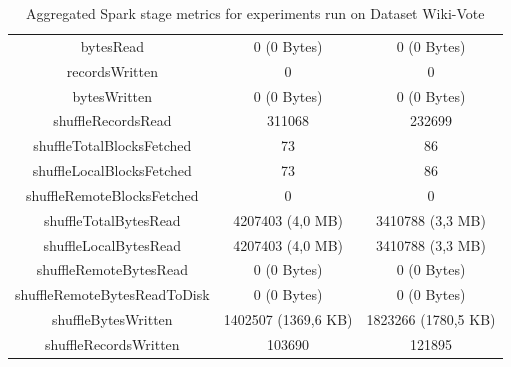 \documentclass[a4paper,11pt, twoside]{article}
\begin{document}
\begin{table}[h!]
\begin{tabular}{ccc}
                        bytesRead & 0 (0 Bytes) & 0 (0 Bytes) \\
                        recordsWritten & 0 & 0 \\
                        bytesWritten & 0 (0 Bytes) & 0 (0 Bytes) \\
                        shuffleRecordsRead & 311068 & 232699 \\
                        shuffleTotalBlocksFetched & 73 & 86 \\
                        shuffleLocalBlocksFetched & 73 & 86 \\
                        shuffleRemoteBlocksFetched & 0 & 0 \\
                        shuffleTotalBytesRead & 4207403 (4,0 MB) & 3410788 (3,3 MB) \\
                        shuffleLocalBytesRead & 4207403 (4,0 MB) & 3410788 (3,3 MB) \\
                        shuffleRemoteBytesRead & 0 (0 Bytes) & 0 (0 Bytes) \\
                        shuffleRemoteBytesReadToDisk & 0 (0 Bytes) & 0 (0 Bytes) \\
                        shuffleBytesWritten & 1402507 (1369,6 KB) & 1823266 (1780,5 KB) \\
                        shuffleRecordsWritten & 103690 & 121895 \\
            		\bottomrule
            	\end{tabular}
                    \caption{Aggregated Spark stage metrics for experiments run on Dataset Wiki-Vote}
                    \label{tab:stagemetrics1}
            \end{table} 
\end{document}
